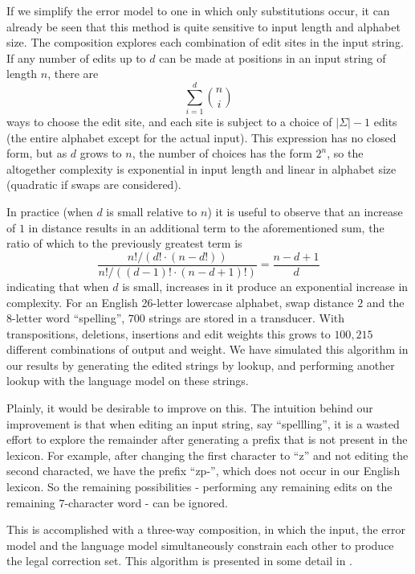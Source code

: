\documentclass[11pt]{article}
\begin{document}
If we simplify the error model to one in which only substitutions occur, it can
already be seen that this method is quite sensitive to input length and
alphabet size. The composition explores each combination of edit sites in the
input string. If any number of edits up to $d$ can be made at positions in an
input string of length $n$, there are
\begin{displaymath}
\sum_{i=1}^{d} {n \choose i}
\end{displaymath}
ways to choose the edit site, and each site is subject to a choice of
$|\Sigma| - 1$ edits (the
entire alphabet except for the actual input). This expression has no closed
form, but as $d$ grows to $n$, the number of choices has the form $2^n$,
so the altogether complexity is exponential in input length and linear
in alphabet size (quadratic if swaps are considered).

In practice
(when $d$ is small relative to $n$) it is useful to observe that an
increase of $1$ in distance results
in an additional term to the aforementioned sum,
the ratio of which to the previously greatest term is
\begin{displaymath}
\frac{n!/(d!\cdot(n-d!))}{n!/((d-1)!\cdot(n-d+1)!)} = \frac{n-d+1}{d}
\end{displaymath}
indicating that when $d$ is small, increases in it produce an
exponential increase in complexity.
For an English 26-letter lowercase alphabet, swap
distance $2$ and the $8$-letter word ``spelling'', $700$ strings are
stored in a transducer. With transpositions, deletions, insertions and edit
weights this grows to $100,215$ different combinations of output and weight. We
have simulated this algorithm in our results by generating the edited strings
by lookup, and performing another lookup with the language model on these
strings.

Plainly, it would be desirable to improve on this. The intuition behind our
improvement is that when editing an input string, say ``spellling'', it is a
wasted effort to explore the remainder after generating a prefix that is not
present in the lexicon. For example, after changing the first character to ``z''
and not editing the second characted, we have the prefix \mbox{``zp-''}, which does
not occur in our English lexicon. So the remaining possibilities - performing
any remaining edits on the remaining $7$-character word - can be ignored.

This is accomplished with a three-way composition, in which the input, the
error model and the language model simultaneously constrain each other to
produce the legal correction set. This algorithm is presented in some detail
in .
\end{document}
